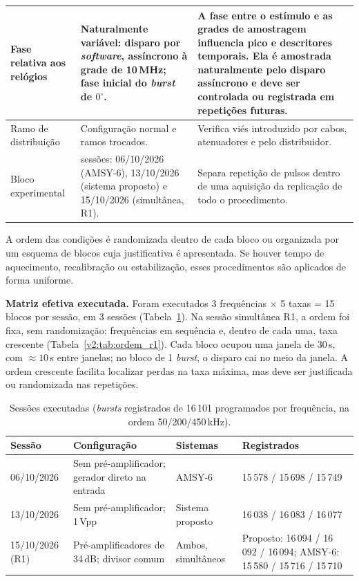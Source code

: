 \begin{longtable}{|
		>{\raggedright\arraybackslash}p{3.2cm}|
		>{\raggedright\arraybackslash}p{4.6cm}|
		>{\raggedright\arraybackslash}p{6.6cm}|}
	\hline
	Fase relativa aos relógios & Naturalmente variável: disparo por \textit{software}, assíncrono à grade de 10\,MHz; fase inicial do \textit{burst} de \(0^\circ\). & A fase entre o estímulo e as grades de amostragem influencia pico e descritores temporais. Ela é amostrada naturalmente pelo disparo assíncrono e deve ser controlada ou registrada em repetições futuras. \\
	\hline
	Ramo de distribuição & Configuração normal e ramos trocados. & Verifica viés introduzido por cabos, atenuadores e pelo distribuidor. \\
	\hline
	Bloco experimental & 3 sessões: 06/10/2026 (AMSY-6), 13/10/2026 (sistema proposto) e 15/10/2026 (simultânea, R1). & Separa repetição de pulsos dentro de uma aquisição da replicação de todo o procedimento. \\
\end{longtable}
\endgroup

A ordem das condições é randomizada dentro de cada bloco ou organizada por um esquema de blocos cuja justificativa é apresentada. Se houver tempo de aquecimento, recalibração ou estabilização, esses procedimentos são aplicados de forma uniforme.

\textbf{Matriz efetiva executada.} Foram executados 3 frequências \(\times\) 5 taxas = 15 blocos por sessão, em 3 sessões (Tabela~\ref{v2:tab:sessoes_executadas}). Na sessão simultânea R1, a ordem foi fixa, sem randomização: frequências em sequência e, dentro de cada uma, taxa crescente (Tabela~\ref{v2:tab:ordem_r1}). Cada bloco ocupou uma janela de 30\,s, com \(\approx 10\)\,s entre janelas; no bloco de 1 \textit{burst}, o disparo cai no meio da janela. A ordem crescente facilita localizar perdas na taxa máxima, mas deve ser justificada ou randomizada nas repetições.

\begin{table}[htbp]
	\centering
	\footnotesize
		\caption{Sessões executadas (\textit{bursts} registrados de 16\,101 programados por frequência, na ordem 50/200/450\,kHz).}
	\label{v2:tab:sessoes_executadas}
	\begin{tabular}{|p{}|p{}|p{}|p{}|}
		\hline
		\textbf{Sessão} & \textbf{Configuração} & \textbf{Sistemas} & \textbf{Registrados} \\
		\hline
		06/10/2026 & Sem pré-amplificador; gerador direto na entrada & AMSY-6 & 15\,578 / 15\,698 / 15\,749 \\
		\hline
		13/10/2026 & Sem pré-amplificador; 1\,Vpp & Sistema proposto & 16\,038 / 16\,083 / 16\,077 \\
		\hline
		15/10/2026 (R1) & Pré-amplificadores de 34\,dB; divisor comum & Ambos, simultâneos & Proposto: 16\,094 / 16\,092 / 16\,094; AMSY-6: 15\,580 / 15\,716 / 15\,710 \\
		\hline
	\end{tabular}
\end{table}

